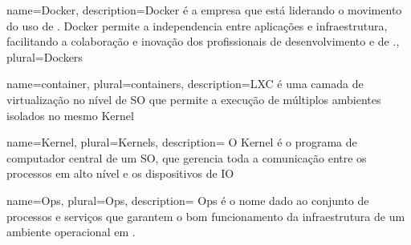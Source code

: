 
{
  name=Docker,
  description={Docker é a empresa que está liderando o movimento do uso de . Docker permite a independencia entre aplicações e infraestrutura, facilitando a colaboração e inovação dos profissionais de desenvolvimento e de .},
  plural=Dockers
}

{
  name=container,
  plural=containers,
  description={\gls{LXC} é uma camada de virtualização no nível de \gls{SO} que permite a execução de múltiplos ambientes isolados no mesmo \gls{Kernel}
  }
}

{
  name=Kernel,
  plural=Kernels,
  description={
    O Kernel é o programa de computador central de um \gls{SO}, que gerencia toda a comunicação entre os processos em alto nível e os dispositivos de \gls{IO}
  }
}

{
  name=Ops,
  plural=Ops,
  description={
    Ops é o nome dado ao conjunto de processos e serviços que garantem o bom funcionamento da infraestrutura de um ambiente operacional em .
  }
}



